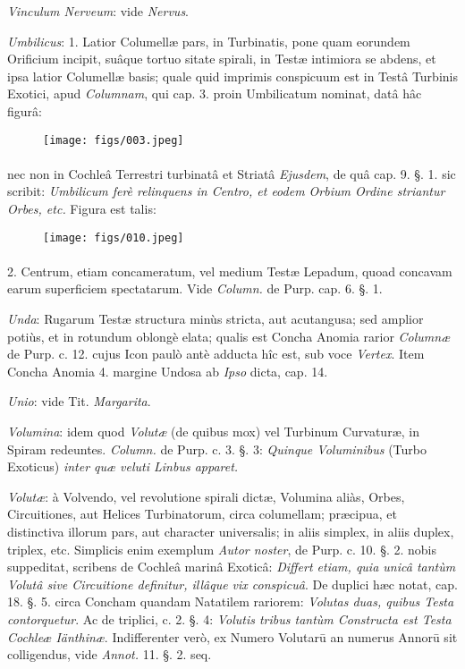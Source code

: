 \documentclass[a4paper, 11pt, oneside, polutonikogreek, german]{article}
\begin{document}
\emph{Vinculum Nerveum}: vide \emph{Nervus}.

\emph{Umbilicus}: 1. Latior Columellæ pars, in Turbinatis, pone quam eorundem Orificium incipit, suâque tortuo sitate spirali, in Testæ intimiora se abdens, et ipsa latior Columellæ basis; quale quid imprimis conspicuum est in Testâ Turbinis Exotici, apud \emph{Columnam}, qui cap. 3. proin Umbilicatum nominat, datâ hâc figurâ:

\begin{figure}[H]
\centering
\texttt{[image: figs/003.jpeg]}
\end{figure}
\paragraph{}
nec non in Cochleâ Terrestri turbinatâ et Striatâ \emph{Ejusdem}, de quâ cap. 9. §. 1. sic scribit: \emph{Umbilicum ferè relinquens in Centro, et eodem Orbium Ordine striantur Orbes, etc.} Figura est talis:

\begin{figure}[H]
\centering
\texttt{[image: figs/010.jpeg]}
\end{figure}
\paragraph{}
2. Centrum, etiam concameratum, vel medium Testæ Lepadum, quoad concavam earum superficiem spectatarum. Vide \emph{Column.} de Purp. cap. 6. §. 1.

\emph{Unda}: Rugarum Testæ structura minùs stricta, aut acutangusa; sed amplior potiùs, et in rotundum oblongè elata; qualis est Concha Anomia rarior \emph{Columnæ} de Purp. c. 12. cujus Icon paulò antè adducta hîc est, sub voce \emph{Vertex}. Item Concha Anomia 4. margine Undosa ab \emph{Ipso} dicta, cap. 14.

\emph{Unio}: vide Tit. \emph{Margarita}.

\emph{Volumina}: idem quod \emph{Volutæ} (de quibus mox) vel Turbinum Curvaturæ, in Spiram redeuntes. \emph{Column.} de Purp. c. 3. §. 3: \emph{Quinque Voluminibus} (Turbo Exoticus) \emph{inter quæ veluti Linbus apparet.}

\emph{Volutæ}: à Volvendo, vel revolutione spirali dictæ, Volumina aliàs, Orbes, Circuitiones, aut Helices Turbinatorum, circa columellam; præcipua, et distinctiva illorum pars, aut character universalis; in aliis simplex, in aliis duplex, triplex, etc. Simplicis enim exemplum \emph{Autor noster}, de Purp. c. 10. §. 2. nobis suppeditat, scribens de Cochleâ marinâ Exoticâ: \emph{Differt etiam, quia unicâ tantùm Volutâ sive Circuitione definitur, illâque vix conspicuâ}. De duplici hæc notat, cap. 18. §. 5. circa Concham quandam Natatilem rariorem: \emph{Volutas duas, quibus Testa contorquetur}. Ac de triplici, c. 2. §. 4: \emph{Volutis tribus tantùm Constructa est Testa Cochleæ Iänthinæ}. Indifferenter verò, ex Numero Volutarū an numerus Annorū sit colligendus, vide \emph{Annot.} 11. §. 2. seq.
\end{document}
